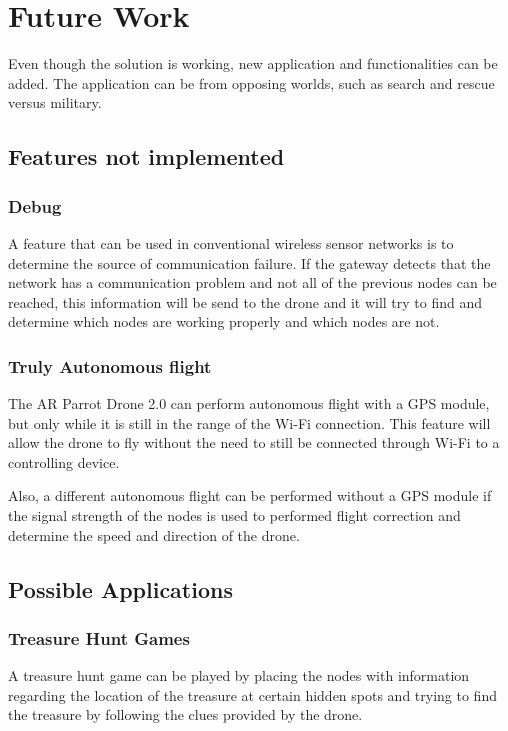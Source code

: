 \normalfont\normalsize
\chapter{Future Work}

Even though the solution is working, new application and functionalities can be added. The application can be from opposing worlds, such as search and rescue versus military.


\section{Features not implemented}

\subsection{Debug}

A feature that can be used in conventional wireless sensor networks is to determine the source of communication failure. If the gateway detects that the network has a communication problem and not all of the previous nodes can be reached, this information will be send to the drone and it will try to find and determine which nodes are working properly and which nodes are not.

\subsection{Truly Autonomous flight}
The AR Parrot Drone 2.0 can perform autonomous flight with a GPS module, but only while it is still in the range of the Wi-Fi connection. This feature will allow the drone to fly without the need to still be connected through Wi-Fi to a controlling device.

Also, a different autonomous flight can be performed without a GPS module if the signal strength of the nodes is used to performed flight correction and determine the speed and direction of the drone.


\section{Possible Applications}

\subsection{Treasure Hunt Games}
A treasure hunt game can be played by placing the nodes with information regarding the location of the treasure at certain hidden spots and trying to find the treasure by following the clues provided by the drone.




\clearpage
